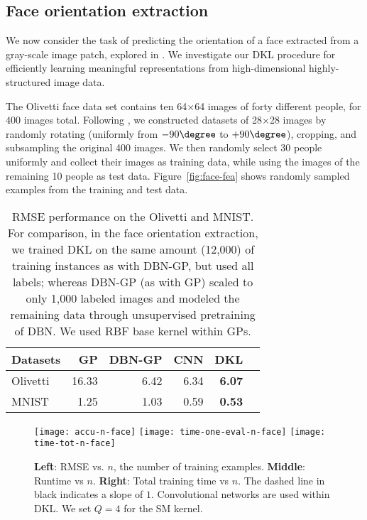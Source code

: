 \documentclass[twoside,11pt]{article}
\begin{document}
\subsection{Face orientation extraction}
\label{sec:exp-face}

We now consider the task of predicting the orientation of a face extracted from a gray-scale image patch, explored in \citet{salakhutdinov2008}.
We investigate our DKL procedure for efficiently learning meaningful representations from high-dimensional highly-structured image data.

The Olivetti face data set contains ten 64$\times$64 images of forty different people, for $400$ images total.  Following \cite{salakhutdinov2008}, we constructed datasets of 28$\times$28 images by randomly rotating (uniformly from $-90\degree$  to $+90\degree$), cropping, and subsampling the original 400 images. We then randomly select 30 people uniformly and collect their images as training data, while using the images of the remaining 10 people as test data. Figure~\ref{fig:face-fea} shows randomly sampled examples from the training and test data.


\begin{table}[t]
  \centering
  \caption{\small RMSE performance on the Olivetti and MNIST.  For comparison, in the face orientation extraction, we trained DKL on the same amount (12,000) of training instances as with DBN-GP, but used all labels; whereas DBN-GP (as with GP) scaled to only 1,000 labeled images and modeled the remaining data through unsupervised pretraining of DBN. We used RBF base kernel within GPs.\vspace{1mm}}
\begin{tabular}{@{}l  r r r r r }\toprule
 Datasets & GP & DBN-GP & CNN & DKL \\\midrule
 Olivetti & 16.33 & 6.42 & 6.34 & {\bf 6.07} \\
 MNIST & 1.25 & 1.03 & 0.59  & {\bf 0.53} \\
 \bottomrule
\end{tabular}
\label{tab:mnist-face}
\end{table}

\begin{figure*}[t]

\centering
 \subfigure
    {\texttt{[image: accu-n-face]}}
  \subfigure
    {\texttt{[image: time-one-eval-n-face]}}
  \subfigure
    {\texttt{[image: time-tot-n-face]}}

  \caption{\small {\bf Left}: RMSE vs. $n$, the number of training examples.
   {\bf Middle}: Runtime vs $n$.
   {\bf Right}: Total training time vs $n$. The dashed line in black indicates a slope of $1$. Convolutional networks are used within DKL. We set $Q=4$ for the SM kernel. }
 \label{fig:rmse-n}

\end{figure*}
\end{document}
